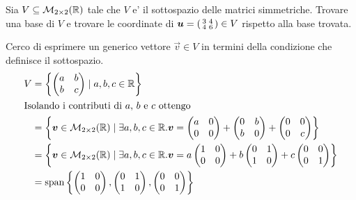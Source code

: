 \begin{example}
    Sia $V \subseteq \M_{2 \times 2}(\R)$ tale che $V$ e' il sottospazio delle matrici simmetriche. Trovare una base di $V$ e trovare le coordinate di $\vec{u} = \begin{psmallmatrix}
        3 & 4 \\ 4 & 6
    \end{psmallmatrix} \in V$ rispetto alla base trovata.
\end{example}
\begin{solution}
    Cerco di esprimere un generico vettore $\vec{v} \in V$ in termini della condizione che definisce il sottospazio.
    \begin{alignat*}
        {1}
        V &= \left\{ \begin{pmatrix} a&b\\b&c \end{pmatrix}\mid a, b, c \in \R\right\} \\
        \intertext{Isolando i contributi di $a$, $b$ e $c$ ottengo}
        &= \left\{ \vec{v} \in \M_{2 \times 2}(\R) \mid \exists a, b, c \in \R. \vec{v} = \begin{pmatrix} a&0\\0&0 \end{pmatrix} + \begin{pmatrix} 0&b\\b&0 \end{pmatrix} + \begin{pmatrix} 0&0\\0&c \end{pmatrix}\right\} \\
        &= \left\{ \vec{v} \in \M_{2 \times 2}(\R) \mid \exists a, b, c \in \R. \vec{v} = a\begin{pmatrix} 1&0\\0&0 \end{pmatrix} + b\begin{pmatrix} 0&1\\1&0 \end{pmatrix} + c\begin{pmatrix} 0&0\\0&1 \end{pmatrix}\right\} \\
        &= \Span{\begin{pmatrix} 1&0\\0&0 \end{pmatrix}, \begin{pmatrix} 0&1\\1&0 \end{pmatrix}, \begin{pmatrix} 0&0\\0&1 \end{pmatrix}} \\
    \end{alignat*}


\end{solution}
